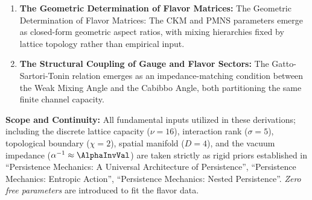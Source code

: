 \begin{enumerate}
    \item \textbf{The Geometric Determination of Flavor Matrices:} The Geometric Determination of Flavor Matrices: The CKM and PMNS parameters emerge as closed-form geometric aspect ratios, with mixing hierarchies fixed by lattice topology rather than empirical input.
    
    \item \textbf{The Structural Coupling of Gauge and Flavor Sectors:} The Gatto-Sartori-Tonin relation emerges as an impedance-matching condition between the Weak Mixing Angle and the Cabibbo Angle, both partitioning the same finite channel capacity.
\end{enumerate}

\textbf{Scope and Continuity:} All fundamental inputs utilized in these derivations; including the discrete lattice capacity ($\nu=16$), interaction rank ($\sigma=5$), topological boundary ($\chi=2$), spatial manifold ($D=4$), and the vacuum impedance ($\alpha^{-1} \approx \AlphaInvVal$) are taken strictly as rigid priors established in ``Persistence Mechanics: A Universal Architecture of Persistence''\cite{meyer_informational_2026}, ``Persistence Mechanics: Entropic Action''\cite{meyer_ieaction_2026}, ``Persistence Mechanics: Nested Persistence''\cite{meyer_ienested_2026}. \textit{Zero free parameters} are introduced to fit the flavor data.